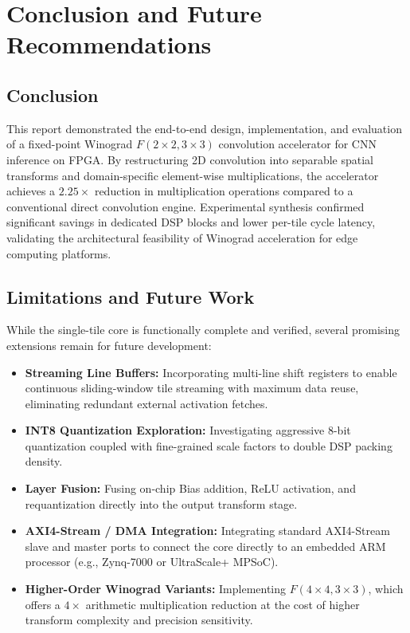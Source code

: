 \documentclass[12pt,a4paper]{article}
\begin{document}
\section{Conclusion and Future Recommendations}

\subsection{Conclusion}
This report demonstrated the end-to-end design, implementation, and evaluation of a fixed-point Winograd $F(2 \times 2, 3 \times 3)$ convolution accelerator for CNN inference on FPGA. By restructuring 2D convolution into separable spatial transforms and domain-specific element-wise multiplications, the accelerator achieves a $2.25\times$ reduction in multiplication operations compared to a conventional direct convolution engine. Experimental synthesis confirmed significant savings in dedicated DSP blocks and lower per-tile cycle latency, validating the architectural feasibility of Winograd acceleration for edge computing platforms.

\subsection{Limitations and Future Work}
While the single-tile core is functionally complete and verified, several promising extensions remain for future development:
\begin{itemize}
    \item \textbf{Streaming Line Buffers:} Incorporating multi-line shift registers to enable continuous sliding-window tile streaming with maximum data reuse, eliminating redundant external activation fetches.
    \item \textbf{INT8 Quantization Exploration:} Investigating aggressive 8-bit quantization coupled with fine-grained scale factors to double DSP packing density.
    \item \textbf{Layer Fusion:} Fusing on-chip Bias addition, ReLU activation, and requantization directly into the output transform stage.
    \item \textbf{AXI4-Stream / DMA Integration:} Integrating standard AXI4-Stream slave and master ports to connect the core directly to an embedded ARM processor (e.g., Zynq-7000 or UltraScale+ MPSoC).
    \item \textbf{Higher-Order Winograd Variants:} Implementing $F(4 \times 4, 3 \times 3)$, which offers a $4\times$ arithmetic multiplication reduction at the cost of higher transform complexity and precision sensitivity.
\end{itemize}
\end{document}
